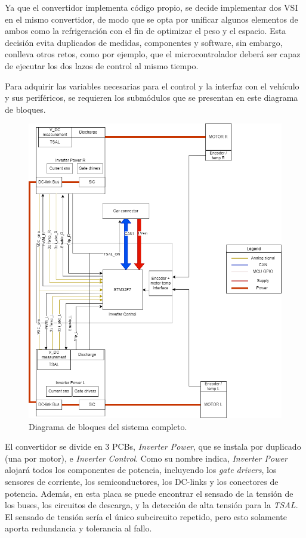 Ya que el convertidor implementa código propio, se decide implementar dos VSI en el mismo convertidor, de modo que se opta por unificar algunos elementos de ambos como la refrigeración con el fin de optimizar el peso y el espacio. Esta decisión evita duplicados de medidas, componentes y software, sin embargo, conlleva otros retos, como por ejemplo, que el microcontrolador deberá ser capaz de ejecutar los dos lazos de control al mismo tiempo.

Para adquirir las variables necesarias para el control y la interfaz con el vehículo y sus periféricos, se requieren los submódulos que se presentan en este diagrama de bloques.

\begin{figure}[H]
	\centering
	\includegraphics[width=0.7\linewidth]{fig/Inverter_HW}
	\caption{Diagrama de bloques del sistema completo.}
\end{figure}

El convertidor se divide en 3 PCBs, \textit{Inverter Power}, que se instala por duplicado (una por motor), e \textit{Inverter Control}. Como su nombre indica, \textit{Inverter Power} alojará todos los componentes de potencia, incluyendo los \textit{gate drivers}, los sensores de corriente, los semiconductores, los DC-links y los conectores de potencia. Además, en esta placa se puede encontrar el sensado de la tensión de los buses, los circuitos de descarga, y la detección de alta tensión para la \textit{TSAL}. El sensado de tensión sería el único subcircuito repetido, pero esto solamente aporta redundancia y tolerancia al fallo.

